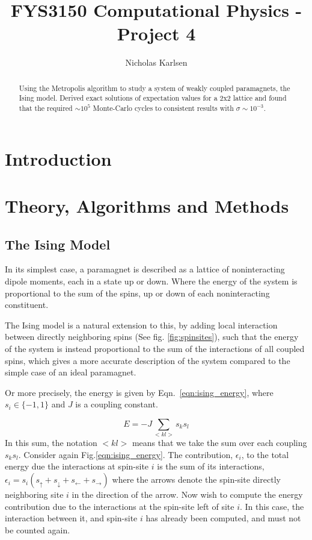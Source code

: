\documentclass[10pt,showpacs,preprintnumbers,amsmath,amssymb,nofootinbib,aps,prl,twocolumn,groupedaddress,superscriptaddress,showkeys]{revtex4-1}
\begin{document}
\title{FYS3150 Computational Physics - Project 4}
\author{Nicholas Karlsen}


\begin{abstract}
  Using the Metropolis algorithm to study a system of weakly coupled paramagnets, the Ising model. Derived exact solutions of expectation values for a 2x2 lattice and found that the required $\sim10^5$ Monte-Carlo cycles to consistent results with $\sigma\sim10^{-3}$.
\end{abstract}

\maketitle


\section{Introduction}
\section{Theory, Algorithms and Methods}
  \subsection{The Ising Model}
    In its simplest case, a paramagnet is described as a lattice of noninteracting dipole moments, each in a state up or down. Where the energy of the system is proportional to the sum of the spins, up or down of each noninteracting constituent.

    The Ising model is a natural extension to this, by adding local interaction between directly neighboring spins (See fig. \ref{fig:spinsites}), such that the energy of the system is instead proportional to the sum of the interactions of all coupled spins, which gives a more accurate description of the system compared to the simple case of an ideal paramagnet.

    Or more precisely, the energy is given by Eqn.~\ref{eqn:ising_energy}, where $s_i \in \{-1, 1\}$ and $J$ is a coupling constant.

    \begin{equation}
      E = -J\sum_{<kl>} s_ks_l
      \label{eqn:ising_energy}
    \end{equation}
    In this sum, the notation $<kl>$ means that we take the sum over each coupling $s_k s_l$.
    Consider again Fig.\ref{eqn:ising_energy}. The contribution, $\epsilon_i$, to the total energy due the interactions at spin-site $i$ is the sum of its interactions, $\epsilon_i = s_i(s_\uparrow + s_\downarrow + s_\leftarrow + s_\rightarrow)$ where the arrows denote the spin-site directly neighboring site $i$ in the direction of the arrow. Now wish to compute the energy contribution due to the interactions at the spin-site left of site $i$. In this case, the interaction between it, and spin-site $i$ has already been computed, and must not be counted again.
\end{document}
